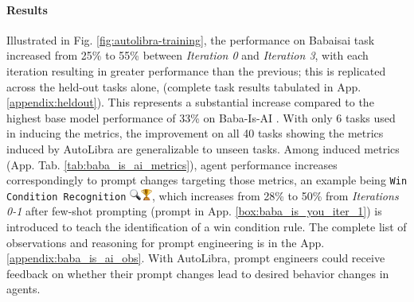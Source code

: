 \paragraph{Results}
Illustrated in Fig. \ref{fig:autolibra-training}, the performance on Babaisai task increased from 25\% to 55\% between \textit{Iteration 0} and \textit{Iteration 3}, with each iteration resulting in greater performance than the previous; this is replicated across the held-out tasks alone, (complete task results tabulated in App. \ref{appendix:heldout}). This represents a substantial increase compared to the highest base model performance of 33\% on Baba-Is-AI \citep{paglieri2024balrog}. With only 6 tasks used in inducing the metrics, the improvement on all 40 tasks showing the metrics induced by AutoLibra are generalizable to unseen tasks. Among induced metrics (App. Tab. \ref{tab:baba_is_ai_metrics}), agent performance increases correspondingly to prompt changes targeting those metrics, an example being \texttt{Win Condition Recognition} \includegraphics[height=1em]{figs/emojis/emoji_1.png}, which increases from 28\% to 50\% from \textit{Iterations 0-1} after few-shot prompting (prompt in App. \ref{box:baba_is_you_iter_1}) is introduced to teach the identification of a win condition rule. The complete list of observations and reasoning for prompt engineering is in the App. \ref{appendix:baba_is_ai_obs}. With AutoLibra, prompt engineers could receive feedback on whether their prompt changes lead to desired behavior changes in agents. 

